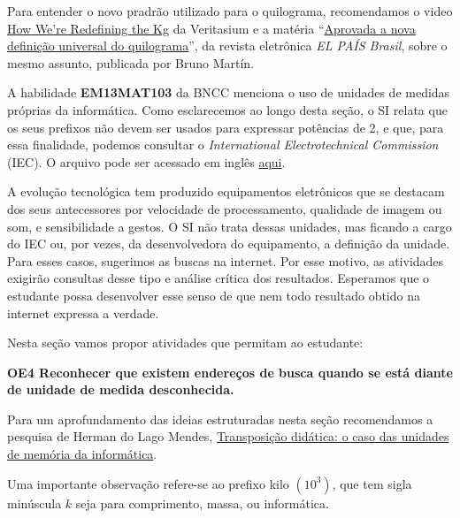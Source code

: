 \begin{research}
Para entender o novo pradrão utilizado para o quilograma, recomendamos o video \href{https://youtu.be/Oo0jm1PPRuo}{How We’re Redefining the Kg} da Veritasium e a matéria “\href{https://brasil.elpais.com/brasil/2018/11/13/ciencia/1542109733\_360096.html}{Aprovada a nova definição universal do quilograma}”, da revista eletrônica \emph{EL PAÍS Brasil}, sobre o mesmo assunto, publicada por Bruno Martín.
\end{research}

\cleardoublepage
\def\currentcolor{session1}
\begin{texto}
{
A habilidade \textbf{EM13MAT103} da BNCC menciona o uso de unidades de medidas próprias da informática. Como esclarecemos ao longo desta seção, o SI relata que os seus prefixos não devem ser usados para expressar potências de 2, e que, para essa finalidade, podemos consultar o \textit{International Electrotechnical Commission} (IEC). O arquivo pode ser acessado em inglês \href{https://www.iec.ch/tcnews/archives/pdf/tclet6.pdf}{aqui}.

A evolução tecnológica tem produzido equipamentos eletrônicos que se destacam dos seus antecessores por velocidade de processamento, qualidade de imagem ou som, e sensibilidade a gestos. O SI não trata dessas unidades, mas ficando a cargo do IEC ou, por vezes, da desenvolvedora do equipamento, a definição da unidade. Para esses casos, sugerimos as buscas na internet. Por esse motivo, as atividades exigirão consultas desse tipo e análise crítica dos resultados. Esperamos que o estudante possa desenvolver esse senso de que nem todo resultado obtido na internet expressa a verdade.

Nesta seção vamos propor atividades que permitam ao estudante:

\textbf{OE4 Reconhecer que existem endereços de busca quando se está diante de unidade de medida desconhecida.}

Para um aprofundamento das ideias estruturadas nesta seção recomendamos a pesquisa de Herman do Lago Mendes, \href{https://periodicos.ufsc.br/index.php/revemat/article/view/1981-1322.2016v11n2p156}{Transposição didática: o caso das unidades de memória da informática}.

Uma importante observação refere-se ao prefixo kilo \((10^3)\), que tem sigla minúscula \(k\) seja para comprimento, massa, ou informática.
}
\end{texto}

